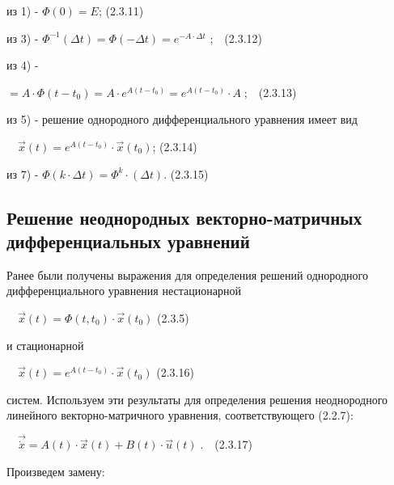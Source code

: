 		из 1) -  $\Phi (0)=E$;  (2.3.11)



		из 3) -  $\Phi ^{-1}(\mathit{\Delta t})=\Phi (-\mathit{\Delta t})=e^{-A\cdot \mathit{\Delta t}}$ ;\ \ (2.3.12)



		из 4) - 



		$=A\cdot \Phi (t-t_0)=A\cdot e^{A(t-t_0)}=e^{A(t-t_0)}\cdot A\;$;\ \ (2.3.13)



		из 5) - решение однородного дифференциального уравнения имеет вид



		\ \  $\vec x(t)=e^{A(t-t_0)}\cdot \vec x(t_0)$;  (2.3.14)



		из 7) -  $\Phi (k\cdot \mathit{\Delta t})=\Phi ^k\cdot (\mathit{\Delta t})$.  (2.3.15)



\bigskip


\bigskip

\subsection{Решение неоднородных векторно-матричных дифференциальных уравнений}

		Ранее были получены выражения для определения решений однородного дифференциального уравнения нестационарной



		\ \  $\vec x(t)=\Phi (t,t_0)\cdot \vec x(t_0)$  (2.3.5)



		и стационарной 



		\ \  $\vec x(t)=e^{A(t-t_0)}\cdot \vec x(t_0)$  (2.3.16)



		систем. Используем эти результаты для определения решения неоднородного линейного векторно-матричного уравнения,
		соответствующего (2.2.7):



		\ \  $\vec{\dot x}=A(t)\cdot \vec x(t)+B(t)\cdot \vec u(t)\;$.\ \ (2.3.17)



		Произведем замену:



